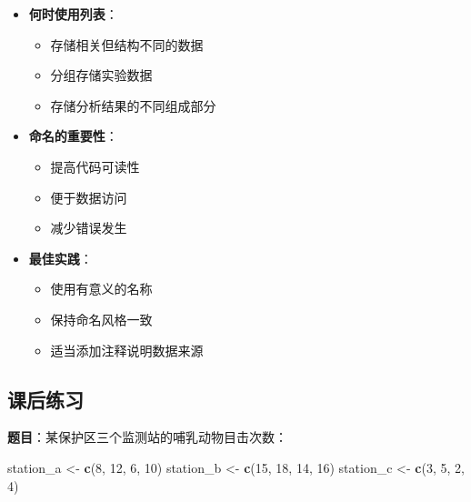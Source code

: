 \documentclass[
  twoside]{book}
\newenvironment{Shaded}{\begin{snugshade}}{\end{snugshade}}
\newcommand{\DecValTok}[1]{\textcolor[rgb]{0.00,0.00,0.81}{#1}}
\newcommand{\FunctionTok}[1]{\textcolor[rgb]{0.13,0.29,0.53}{\textbf{#1}}}
\newcommand{\NormalTok}[1]{#1}
\newcommand{\OtherTok}[1]{\textcolor[rgb]{0.56,0.35,0.01}{#1}}
\providecommand{\tightlist}{%
  \setlength{\itemsep}{0pt}\setlength{\parskip}{0pt}}
\begin{document}
\begin{itemize}
\tightlist
\item
  \textbf{何时使用列表}：

  \begin{itemize}
  \tightlist
  \item
    存储相关但结构不同的数据
  \item
    分组存储实验数据
  \item
    存储分析结果的不同组成部分
  \end{itemize}
\item
  \textbf{命名的重要性}：

  \begin{itemize}
  \tightlist
  \item
    提高代码可读性
  \item
    便于数据访问
  \item
    减少错误发生
  \end{itemize}
\item
  \textbf{最佳实践}：

  \begin{itemize}
  \tightlist
  \item
    使用有意义的名称
  \item
    保持命名风格一致
  \item
    适当添加注释说明数据来源
  \end{itemize}
\end{itemize}

\hypertarget{ux8bfeux540eux7ec3ux4e60-3}{%
\subsection{课后练习}\label{ux8bfeux540eux7ec3ux4e60-3}}

\textbf{题目}：某保护区三个监测站的哺乳动物目击次数：

\begin{Shaded}
\begin{Highlighting}[]
\NormalTok{station\_a }\OtherTok{\textless{}{-}} \FunctionTok{c}\NormalTok{(}\DecValTok{8}\NormalTok{, }\DecValTok{12}\NormalTok{, }\DecValTok{6}\NormalTok{, }\DecValTok{10}\NormalTok{)}
\NormalTok{station\_b }\OtherTok{\textless{}{-}} \FunctionTok{c}\NormalTok{(}\DecValTok{15}\NormalTok{, }\DecValTok{18}\NormalTok{, }\DecValTok{14}\NormalTok{, }\DecValTok{16}\NormalTok{)}
\NormalTok{station\_c }\OtherTok{\textless{}{-}} \FunctionTok{c}\NormalTok{(}\DecValTok{3}\NormalTok{, }\DecValTok{5}\NormalTok{, }\DecValTok{2}\NormalTok{, }\DecValTok{4}\NormalTok{)}
\end{Highlighting}
\end{Shaded}
\end{document}
